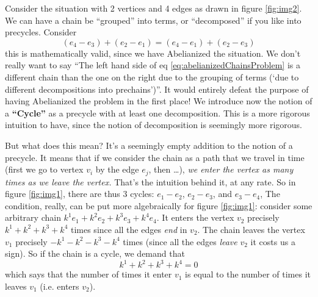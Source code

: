 Consider the situation with 2 vertices and 4 edges
as drawn in figure \ref{fig:img2}. We can have a
chain be ``grouped'' into terms, or ``decomposed'' if you like
into precycles. Consider
\begin{equation}\label{eq:abelianizedChainsProblem}
(e_{4}-e_{3})+(e_{2}-e_{1})=(e_{4}-e_{1})+(e_{2}-e_{3})
\end{equation}
this is mathematically valid, since we have Abelianized the
situation. We don't really want to say ``The left hand side of eq
\eqref{eq:abelianizedChainsProblem} is a different chain than the
one on the right due to the grouping of terms (`due to different
decompositions into prechains')''. It would entirely defeat the
purpose of having Abelianized the problem in the first place! We
introduce now the notion of a \textbf{``Cycle''} as a precycle
with at least one decomposition. This is a more rigorous
intuition to have, since the notion of decomposition is seemingly
more rigorous.

But what does this mean? It's a seemingly empty addition to the
notion of a precycle. It means that if we consider the chain as a
path that we travel in time (first we go to vertex $v_{i}$ by the
edge $e_{j}$, then \ldots), \emph{we enter the vertex as many times as we leave the vertex.}
That's the intuition behind it, at any rate. So in figure
\ref{fig:img1}, there are thus 3 cycles: $e_{1}-e_{2}$,
$e_{2}-e_{3}$, and $e_{3}-e_{4}$, The condition, really, can be put more
algebraically for figure \ref{fig:img1}: consider some arbitrary
chain $k^{1}e_{1}+k^{2}e_{2}+k^{3}e_{3}+k^{4}e_{4}$. It enters the vertex
$v_{2}$ precisely $k^{1}+k^{2}+k^{3}+k^{4}$ times since all the edges
\emph{end} in $v_{2}$. The chain leaves the vertex $v_{1}$
precisely $-k^{1}-k^{2}-k^{3}-k^{4}$ times (since all the edges
\emph{leave} $v_{2}$ it costs us a sign). So if the chain is a
cycle, we demand that
\begin{equation}%
k^{1}+k^{2}+k^{3}+k^{4} = 0
\end{equation}
which says that the number of times it enter $v_{1}$ is equal to
the number of times it leaves $v_{1}$ (i.e. enters $v_{2}$).


